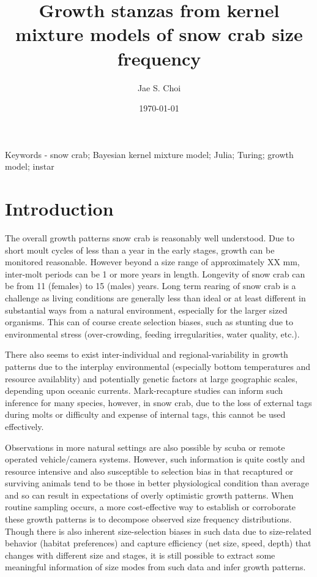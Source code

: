 \documentclass[12pt,letterpaper,]{paper}
\author[1 ,$\ast$ ]{Jae S. Choi}
\affil[1]{Bedford Institute of Oceanography, Fisheriess and Oceans
Canada}
\affil[*]{jae.choi@dfo-mpo.gc.ca}
\date{\today}
\title{Growth stanzas from kernel mixture models of snow crab size
frequency}
\begin{document}
\maketitle %


Keywords - snow crab; Bayesian kernel mixture model; Julia; Turing;
growth model; instar


 
  
\section{Introduction}\label{introduction}

The overall growth patterns snow crab is reasonably well understood. Due
to short moult cycles of less than a year in the early stages, growth
can be monitored reasonable. However beyond a size range of
approximately XX mm, inter-molt periods can be 1 or more years in
length. Longevity of snow crab can be from 11 (females) to 15 (males)
years. Long term rearing of snow crab is a challenge as living
conditions are generally less than ideal or at least different in
substantial ways from a natural environment, especially for the larger
sized organisms. This can of course create selection biases, such as
stunting due to environmental stress (over-crowding, feeding
irregularities, water quality, etc.).

There also seems to exist inter-individual and regional-variability in
growth patterns due to the interplay environmental (especially bottom
temperatures and resource availablity) and potentially genetic factors
at large geographic scales, depending upon oceanic currents.
Mark-recapture studies can inform such inference for many species,
however, in snow crab, due to the loss of external tags during molts or
difficulty and expense of internal tags, this cannot be used
effectively.

Observations in more natural settings are also possible by scuba or
remote operated vehicle/camera systems. However, such information is
quite costly and resource intensive and also susceptible to selection
bias in that recaptured or surviving animals tend to be those in better
physiological condition than average and so can result in expectations
of overly optimistic growth patterns. When routine sampling occurs, a
more cost-effective way to establish or corroborate these growth
patterns is to decompose observed size frequency distributions. Though
there is also inherent size-selection biases in such data due to
size-related behavior (habitat preferences) and capture efficiency (net
size, speed, depth) that changes with different size and stages, it is
still possible to extract some meaningful information of size modes from
such data and infer growth patterns.
\end{document}
